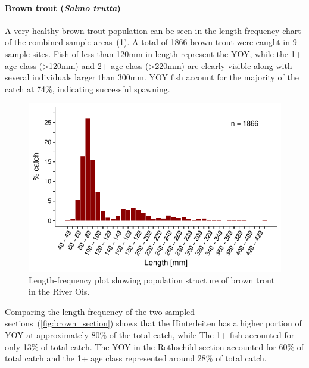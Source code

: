 \paragraph{Brown trout (\textit{Salmo trutta})}\label{sec:ois_bt_lf}

A very healthy brown trout population can be seen in the length-frequency chart of the combined sample areas~(\cref{fig:brown_single}).
A total of 1866 brown trout were caught in 9 sample sites.
Fish of less than 120mm in length represent the YOY, while the 1+ age class (\textgreater120mm) and 2+ age class (\textgreater220mm) are clearly visible along with several individuals larger than 300mm.
YOY fish account for the majority of the catch at 74\%, indicating successful spawning.

\begin{figure}[!htb]                              %
	\center
	\includegraphics[width=.7\textwidth]{images/brown_single.pdf}                %
	\caption{Length-frequency plot showing population structure of brown trout in the River Ois.}        %
	\label{fig:brown_single}                                                       %
\end{figure}

Comparing the length-frequency of the two sampled sections~(\cref{fig:brown_section}) shows that the Hinterleiten has a higher portion of YOY at approximately 80\% of the total catch, while The 1+ fish accounted for only 13\% of total catch.
The YOY in the Rothschild section accounted for 60\% of total catch and the 1+ age class represented around 28\% of total catch.

